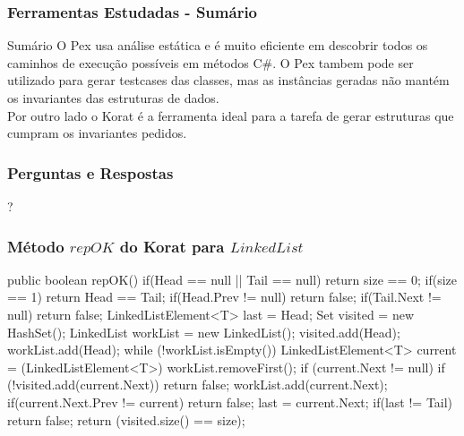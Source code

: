 \documentclass{beamer}
\begin{document}
\begin{frame}[fragile]\frametitle{Ferramentas Estudadas - Sumário}
\begin{block}{Sumário}
O Pex usa análise estática e é muito eficiente em descobrir todos os caminhos de execução possíveis em métodos C\#.
O Pex tambem pode ser utilizado para gerar testcases das classes, mas as instâncias geradas não mantém os invariantes das estruturas de dados.\\

Por outro lado o Korat é a ferramenta ideal para a tarefa de gerar estruturas que cumpram os invariantes pedidos.
\end{block}
\end{frame}

\begin{frame} \frametitle{Perguntas e Respostas}
\begin{center}
\begin{Huge}
?   
\end{Huge}
\end{center}
\end{frame}

\begin{frame}[fragile] \frametitle{Método $repOK$ do Korat para $LinkedList$}
\begin{code}
public boolean repOK() {
  if(Head == null || Tail == null)
    return size == 0;
  if(size == 1) return Head == Tail;
  if(Head.Prev != null) return false;
  if(Tail.Next != null) return false;
  LinkedListElement<T> last = Head;
  Set visited = new HashSet();
  LinkedList workList = new LinkedList();
  visited.add(Head);
  workList.add(Head);
  while (!workList.isEmpty()) {
    LinkedListElement<T> current = (LinkedListElement<T>) workList.removeFirst();
    if (current.Next != null) {
      if (!visited.add(current.Next))
	    return false;
      workList.add(current.Next);
      if(current.Next.Prev != current) return false;
      last = current.Next;
    }
  }
  if(last != Tail)
    return false;
  return (visited.size() == size);
}
\end{code}
\end{frame}
\end{document}
